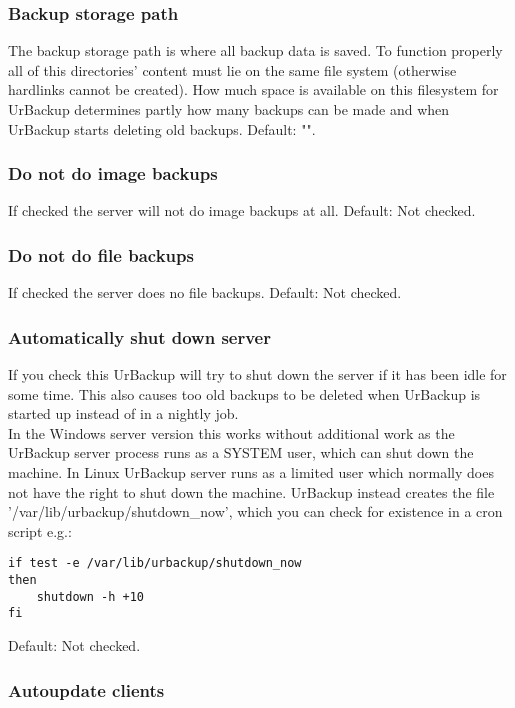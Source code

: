 \documentclass[a4paper,10pt]{article}
\begin{document}
\subsubsection{Backup storage path}

The backup storage path is where all backup data is saved. To function properly all of this directories' content must lie on the same file system (otherwise hardlinks cannot be created). How much space is available on this filesystem for UrBackup determines partly how many backups can be made and when UrBackup starts deleting old backups. Default: "".

\subsubsection{Do not do image backups}

If checked the server will not do image backups at all. Default: Not checked.

\subsubsection{Do not do file backups}

If checked the server does no file backups. Default: Not checked.

\subsubsection{Automatically shut down server}

If you check this UrBackup will try to shut down the server if it has been idle for some time. This also causes too old backups to be deleted when UrBackup is started up instead of in a nightly job.\\
In the Windows server version this works without additional work as the UrBackup server process runs as a SYSTEM user, which can shut down the machine. In Linux UrBackup server runs as a limited user which normally does not have the right to shut down the machine. UrBackup instead creates the file '/var/lib/urbackup/shutdown\_now', which you can check for existence in a cron script e.g.:
\begin{verbatim}
if test -e /var/lib/urbackup/shutdown_now
then
	shutdown -h +10
fi
\end{verbatim}

Default: Not checked.

\subsubsection{Autoupdate clients}
\end{document}
